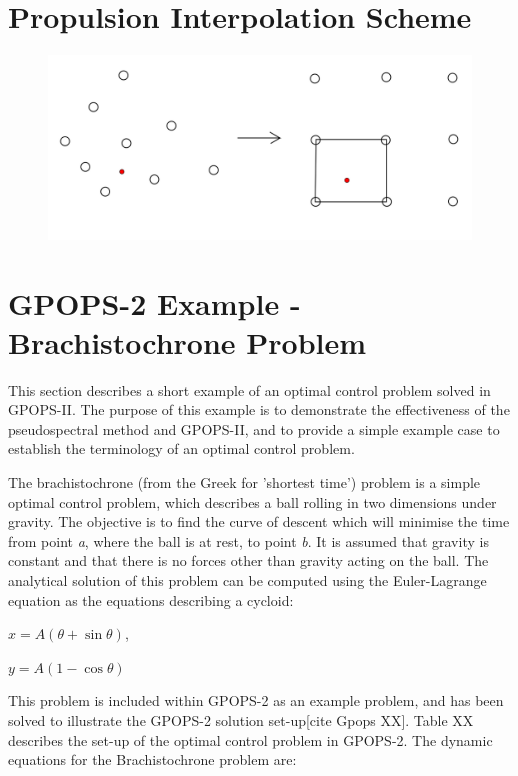 
\chapter{Propulsion Interpolation Scheme}

\begin{figure}
\centering
\includegraphics[width=0.8\linewidth]{figures/A1_uncertainty-analysis/interp}
\caption{}
\label{fig:interp}
\end{figure}

\chapter{GPOPS-2 Example - Brachistochrone Problem}
This section describes a short example of an optimal control problem solved in GPOPS-II. The purpose of this example is to demonstrate the effectiveness of the pseudospectral method and GPOPS-II, and to provide a simple example case to establish the terminology of an optimal control problem.  


The brachistochrone (from the Greek for 'shortest time') problem is a simple optimal control problem, which describes a ball rolling in two dimensions under gravity. The objective is to find the curve of descent which will minimise the time from point \textit{a}, where the ball is at rest, to point \textit{b}. It is assumed that gravity is constant and that there is no forces other than gravity acting on the ball. 
The analytical solution of this problem can be computed using the Euler-Lagrange equation as the equations describing a cycloid:

$x = A(\theta + \sin\theta) $,

$y=A(1 - \cos\theta)$

This problem is included within GPOPS-2 as an example problem, and has been solved to illustrate the GPOPS-2 solution set-up[cite Gpops XX]. Table XX describes the set-up of the optimal control problem in GPOPS-2. The dynamic equations for the Brachistochrone problem are:


